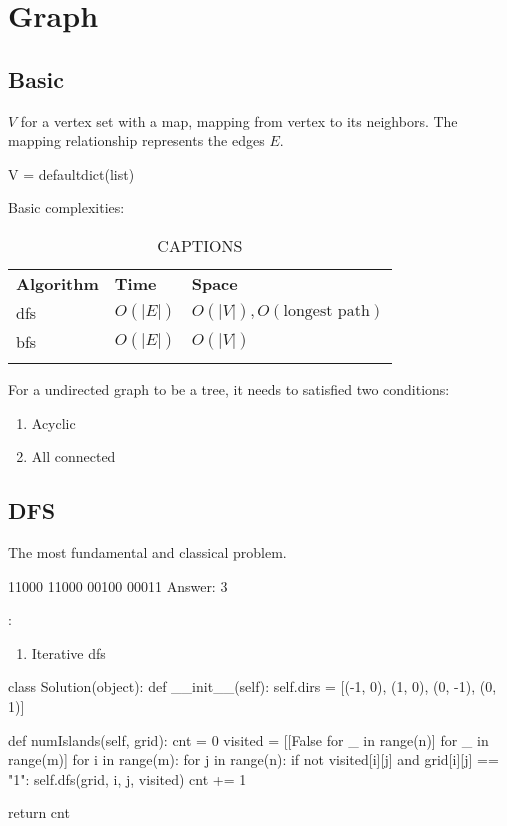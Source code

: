\chapter{Graph}

\section{Basic}
 $V$ for a vertex set with a map, mapping from vertex to its neighbors. The mapping relationship represents the edges $E$.
\begin{python}
V = defaultdict(list)
\end{python}

 Basic complexities:

\begin{table}
\begin{tabular}{lll}
\hline\noalign{\smallskip}
\textbf{Algorithm} & \textbf{Time}  & \textbf{Space}\\
\noalign{\smallskip}\hline\noalign{\smallskip}
dfs & $O(|E|)$ & $O(|V|), O(\text{longest path})$ \\
bfs & $O(|E|)$ & $O(|V|)$ \\
\noalign{\smallskip}\hline\noalign{\smallskip}
\end{tabular}
\caption{CAPTIONS}
\end{table}

 For a undirected graph to be a tree, it needs to satisfied two conditions:
\begin{enumerate}
\item Acyclic
\item All connected
\end{enumerate}
\section{DFS}
 The most fundamental and classical problem.
\begin{python}
11000
11000
00100
00011
Answer: 3
\end{python}
:
\begin{enumerate}
\item Iterative dfs
\end{enumerate}
\begin{python}
class Solution(object):
  def __init__(self):
    self.dirs = [(-1, 0), (1, 0), (0, -1), (0, 1)]

  def numIslands(self, grid):
    cnt = 0
    visited = [[False for _ in range(n)]
               for _ in range(m)]
    for i in range(m):
      for j in range(n):
        if not visited[i][j] and grid[i][j] == "1":
          self.dfs(grid, i, j, visited)
          cnt += 1

    return cnt
\end{python}


